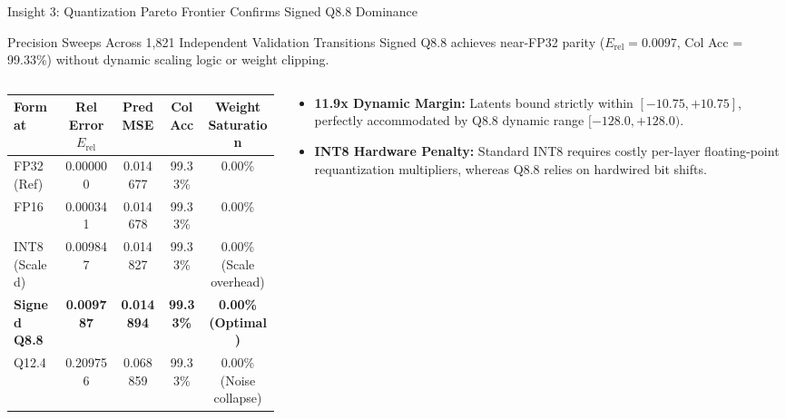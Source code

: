 \documentclass[aspectratio=169, 10pt]{beamer}
\begin{document}
\begin{frame}{Insight 3: Quantization Pareto Frontier Confirms Signed Q8.8 Dominance}
  \begin{block}{Precision Sweeps Across 1,821 Independent Validation Transitions}
    Signed Q8.8 achieves near-FP32 parity ($E_{\text{rel}} = 0.0097$, Col Acc = 99.33\%) without dynamic scaling logic or weight clipping.
  \end{block}
  \vspace{-0.2cm}
  \begin{columns}[T]
    \begin{column}{0.54\textwidth}
      \setlength{\tabcolsep}{2pt}
      \begin{table}
        \centering
        \scriptsize
        \begin{tabular}{lcccc}
          \toprule
          \textbf{Format} & \textbf{Rel Error $E_{\text{rel}}$} & \textbf{Pred MSE} & \textbf{Col Acc} & \textbf{Weight Saturation} \\
          \midrule
          FP32 (Ref) & 0.000000 & 0.014677 & 99.33\% & 0.00\% \\
          FP16 & 0.000341 & 0.014678 & 99.33\% & 0.00\% \\
          INT8 (Scaled) & 0.009847 & 0.014827 & 99.33\% & 0.00\% (Scale overhead) \\
          \textbf{Signed Q8.8} & \textbf{0.009787} & \textbf{0.014894} & \textbf{99.33\%} & \textbf{0.00\% (Optimal)} \\
          Q12.4 & 0.209756 & 0.068859 & 99.33\% & 0.00\% (Noise collapse) \\
          \bottomrule
        \end{tabular}
      \end{table}
    \end{column}
    \begin{column}{0.44\textwidth}
      \begin{itemize}
        \item \textbf{11.9x Dynamic Margin:} Latents bound strictly within $[-10.75, +10.75]$, perfectly accommodated by Q8.8 dynamic range $[-128.0, +128.0)$.
        \item \textbf{INT8 Hardware Penalty:} Standard INT8 requires costly per-layer floating-point requantization multipliers, whereas Q8.8 relies on hardwired bit shifts.
      \end{itemize}
    \end{column}
  \end{columns}
\end{frame}
\end{document}
